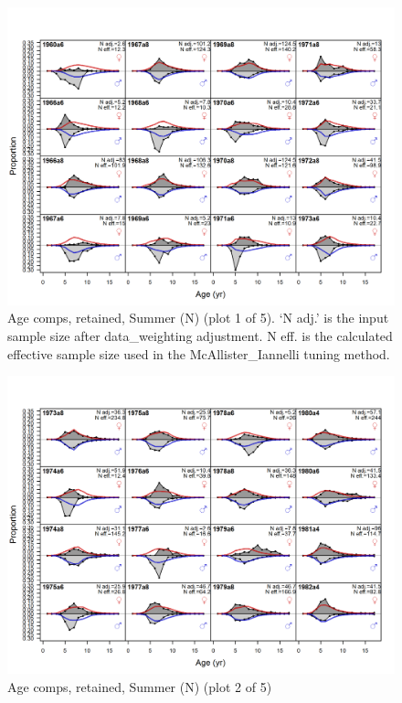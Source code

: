 \documentclass[12pt,]{article}
\begin{document}
\begin{figure}
\centering
\includegraphics{r4ss/plots_mod1/comp_agefit_flt2mkt2_page1.png}
\caption{Age comps, retained, Summer (N) (plot 1 of 5). `N adj.' is the
input sample size after data\_weighting adjustment. N eff. is the
calculated effective sample size used in the McAllister\_Iannelli tuning
method. \label{fig:age_fits}}
\end{figure}

\begin{figure}
\centering
\includegraphics{r4ss/plots_mod1/comp_agefit_flt2mkt2_page2.png}
\caption{Age comps, retained, Summer (N) (plot 2 of 5)
\label{fig:age_fits}}
\end{figure}
\end{document}
